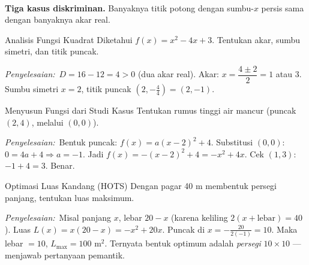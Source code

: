 \documentclass[11pt,a4paper]{report}
\theoremstyle{gaya}
\newcommand{\jawab}{\par\smallskip\noindent\textit{\textcolor{oranye}{Penyelesaian:}}\ }
\begin{document}
\begin{center}
\\
\small \textbf{Tiga kasus diskriminan.} Banyaknya titik potong dengan sumbu-$x$ persis sama dengan banyaknya akar real.
\end{center}

\begin{contoh}{Analisis Fungsi Kuadrat}
Diketahui $f(x) = x^2 - 4x + 3$. Tentukan akar, sumbu simetri, dan titik puncak.

\jawab $D = 16-12 = 4 > 0$ (dua akar real). Akar: $x = \dfrac{4\pm2}{2} = 1$ atau $3$.
Sumbu simetri $x = 2$, titik puncak $\left(2, -\tfrac{4}{4}\right) = (2,-1)$.
\end{contoh}

\begin{contoh}{Menyusun Fungsi dari Studi Kasus}
Tentukan rumus tinggi air mancur (puncak $(2,4)$, melalui $(0,0)$).

\jawab Bentuk puncak: $f(x)=a(x-2)^2+4$. Substitusi $(0,0)$: $0=4a+4\Rightarrow a=-1$. Jadi $f(x)=-(x-2)^2+4=-x^2+4x$. Cek $(1,3)$: $-1+4=3$. Benar.
\end{contoh}

\begin{contoh}{Optimasi Luas Kandang (HOTS)}
Dengan pagar 40 m membentuk persegi panjang, tentukan luas maksimum.

\jawab Misal panjang $x$, lebar $20-x$ (karena keliling $2(x+\text{lebar})=40$). Luas $L(x)=x(20-x)=-x^2+20x$. Puncak di $x=-\tfrac{20}{2(-1)}=10$. Maka lebar $=10$, $L_{\max}=100$ m$^2$. Ternyata bentuk optimum adalah \emph{persegi} $10\times10$ --- menjawab pertanyaan pemantik.
\end{contoh}
\end{document}
